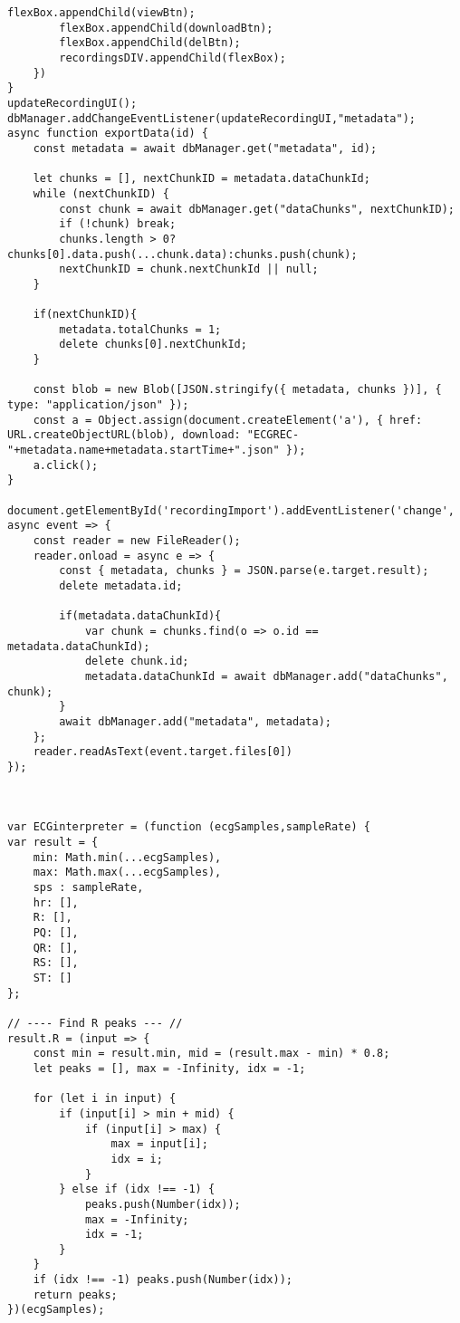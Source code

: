 \begin{lstlisting}[style=htmlcssjs]
        flexBox.appendChild(viewBtn);
        flexBox.appendChild(downloadBtn);
        flexBox.appendChild(delBtn);
        recordingsDIV.appendChild(flexBox);
    })
}
updateRecordingUI();
dbManager.addChangeEventListener(updateRecordingUI,"metadata");
async function exportData(id) {
    const metadata = await dbManager.get("metadata", id);

    let chunks = [], nextChunkID = metadata.dataChunkId;
    while (nextChunkID) {
        const chunk = await dbManager.get("dataChunks", nextChunkID);
        if (!chunk) break;
        chunks.length > 0?chunks[0].data.push(...chunk.data):chunks.push(chunk);
        nextChunkID = chunk.nextChunkId || null;
    }
    
    if(nextChunkID){
        metadata.totalChunks = 1;
        delete chunks[0].nextChunkId;
    }

    const blob = new Blob([JSON.stringify({ metadata, chunks })], { type: "application/json" });
    const a = Object.assign(document.createElement('a'), { href: URL.createObjectURL(blob), download: "ECGREC-"+metadata.name+metadata.startTime+".json" });
    a.click();
}

document.getElementById('recordingImport').addEventListener('change', async event => {
    const reader = new FileReader();
    reader.onload = async e => {
        const { metadata, chunks } = JSON.parse(e.target.result);
        delete metadata.id;
        
        if(metadata.dataChunkId){
            var chunk = chunks.find(o => o.id == metadata.dataChunkId);
            delete chunk.id;
            metadata.dataChunkId = await dbManager.add("dataChunks", chunk);
        }
        await dbManager.add("metadata", metadata);
    };
    reader.readAsText(event.target.files[0])
});



var ECGinterpreter = (function (ecgSamples,sampleRate) {
var result = {
    min: Math.min(...ecgSamples),
    max: Math.max(...ecgSamples),
    sps : sampleRate,
    hr: [],
    R: [],
    PQ: [],
    QR: [],
    RS: [],
    ST: []
};

// ---- Find R peaks --- //
result.R = (input => {
    const min = result.min, mid = (result.max - min) * 0.8;
    let peaks = [], max = -Infinity, idx = -1;
    
    for (let i in input) {
        if (input[i] > min + mid) {
            if (input[i] > max) {
                max = input[i];
                idx = i;
            }
        } else if (idx !== -1) {
            peaks.push(Number(idx));
            max = -Infinity;
            idx = -1;
        }
    }
    if (idx !== -1) peaks.push(Number(idx));
    return peaks;
})(ecgSamples);



\end{lstlisting}
